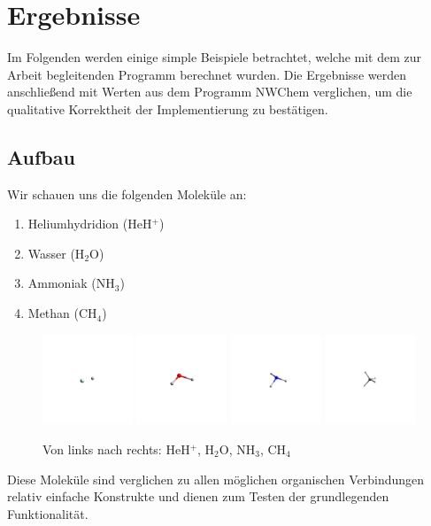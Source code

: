 \chapter{Ergebnisse}
Im Folgenden werden einige simple Beispiele betrachtet,
welche mit dem zur Arbeit begleitenden Programm berechnet wurden.
Die Ergebnisse werden anschließend mit Werten aus dem Programm NWChem \cite{nwchem} verglichen,
um die qualitative Korrektheit der Implementierung zu bestätigen.
\section{Aufbau}
Wir schauen uns die folgenden Moleküle an:
\begin{enumerate}
    \item Heliumhydridion (HeH$^+$)
    \item Wasser (H$_2$O)
    \item Ammoniak (NH$_3$)
    \item Methan (CH$_4$)
\end{enumerate}
\begin{figure}[h]
    \centering
\includegraphics[trim=1400 1400 1400 1400, clip, width=0.24\textwidth]{res/HeH/heh_w.png}
\includegraphics[trim=1400 1400 1400 1400, clip, width=0.24\textwidth]{res/H2O/h2o.png}
\includegraphics[trim=1400 1400 1400 1400, clip, width=0.24\textwidth]{res/NH3/nh3_d.png}
\includegraphics[trim=1400 1400 1400 1400, clip, width=0.24\textwidth]{res/CH4/ch4.png}
\caption{Von links nach rechts: HeH$^+$, H$_2$O, NH$_3$, CH$_4$}\label{molecules}
\end{figure}
Diese Moleküle sind verglichen zu
allen möglichen organischen Verbindungen
relativ einfache Konstrukte und dienen zum Testen
der grundlegenden Funktionalität.

